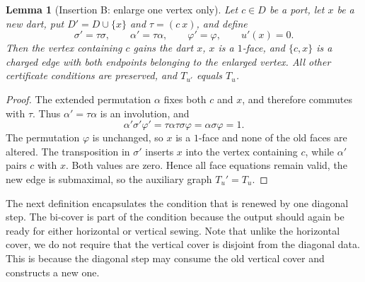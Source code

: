 \documentclass[11pt]{article}
\newtheorem{lemma}[theorem]{Lemma}
\theoremstyle{remark}
\begin{document}
\begin{lemma}[Insertion B: enlarge one vertex only]\label{lem:typeB}
Let $c\in D$ be a port, let $x$ be a new dart, put $D'=D\cup \{x\}$ and $\tau=(c\ x)$, and define
\[
 \sigma'=\tau\sigma,\qquad
 \alpha'=\tau\alpha,\qquad
 \varphi'=\varphi,
 \qquad u'(x)=0.
\]
Then the vertex containing $c$ gains the dart $x$, $x$ is a $1$-face, and $\{c,x\}$ is a charged edge with both endpoints belonging to the enlarged vertex.
All other certificate conditions are
preserved, and $T_{u'}$ equals $T_u$.
\end{lemma}
\begin{proof}
The extended permutation $\alpha$ fixes both $c$ and $x$, and therefore
commutes with $\tau$.  Thus $\alpha'=\tau\alpha$ is an involution, and
\[
       \alpha'\sigma'\varphi'
       =\tau\alpha\tau\sigma\varphi
       =\alpha\sigma\varphi=1.
\]
The permutation $\varphi$ is unchanged, so $x$ is a $1$-face and none of the old faces are
altered.  The transposition in $\sigma'$ inserts $x$ into the vertex containing
$c$, while $\alpha'$ pairs $c$ with $x$.  Both values are zero.  Hence all face
equations remain valid, the new edge is submaximal, so the auxiliary graph $T_u'=T_u$. 
\end{proof}

The next definition encapsulates the condition that is renewed by one
diagonal step.  The bi-cover is part of the condition because the
output should again be ready for either horizontal or vertical sewing.  Note that unlike the horizontal cover, we do not require that the vertical cover is disjoint from the diagonal data. This is because the diagonal step
may consume the old vertical cover and constructs a new one.
\end{document}
